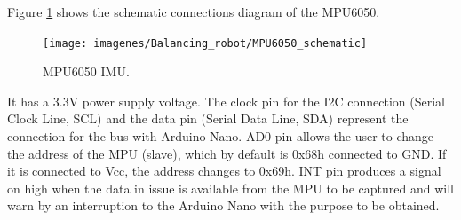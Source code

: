 Figure \ref{fig:MPU6050_schematic} shows the schematic connections diagram of the MPU6050.

\begin{figure}[H]
	\center
	\texttt{[image: imagenes/Balancing\_robot/MPU6050\_schematic]}
	\caption{MPU6050 IMU.}
	\label{fig:MPU6050_schematic}
\end{figure}

It has a 3.3V power supply voltage. The clock pin for the I2C connection (Serial Clock Line, SCL) and the data pin (Serial Data Line, SDA) represent the connection for the bus with Arduino Nano. AD0 pin allows the user to change the address of the MPU (slave), which by default is 0x68h connected to GND. If it is connected to Vcc, the address changes to 0x69h. INT pin produces a signal on high when the data in issue is available from the MPU to be captured and will warn by an interruption to the Arduino Nano with the purpose to be obtained.\newline

